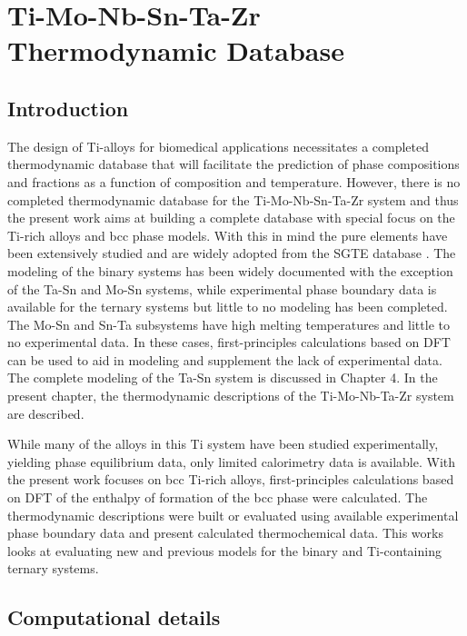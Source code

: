 \chapter{Ti-Mo-Nb-Sn-Ta-Zr \\Thermodynamic Database}

\section{Introduction}

The design of Ti-alloys for biomedical applications necessitates a completed thermodynamic database that will facilitate the prediction of phase compositions and fractions as a function of composition and temperature. However, there is no completed thermodynamic database for the Ti-Mo-Nb-Sn-Ta-Zr system and thus the present work aims at building a complete database with special focus on the Ti-rich alloys and bcc phase models. With this in mind the pure elements have been extensively studied and are widely adopted from the SGTE database \cite{Dinsdale1991}. The modeling of the binary systems has been widely documented with the exception of the Ta-Sn and Mo-Sn systems, while experimental phase boundary data is available for the ternary systems but little to no modeling has been completed. The Mo-Sn and Sn-Ta subsystems have high melting temperatures and little to no experimental data. In these cases, first-principles calculations based on DFT can be used to aid in modeling and supplement the lack of experimental data. The complete modeling of the Ta-Sn system is discussed in Chapter 4. In the present chapter, the thermodynamic descriptions of the Ti-Mo-Nb-Ta-Zr system are described. 

While many of the alloys in this Ti system have been studied experimentally, yielding phase equilibrium data, only limited calorimetry data is available. With the present work focuses on bcc Ti-rich alloys, first-principles calculations based on DFT of the enthalpy of formation of the bcc phase were calculated. The thermodynamic descriptions were built or evaluated using available experimental phase boundary data and present calculated thermochemical data. This works looks at evaluating new and previous models for the binary and Ti-containing ternary systems. 

\section{Computational details}

